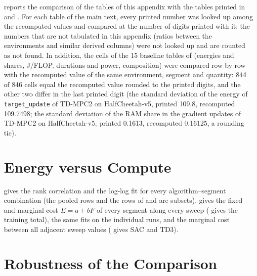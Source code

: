  reports the comparison of the tables of this appendix with the tables printed in  and .
For each table of the main text, every printed number was looked up among the recomputed values and compared at the number of digits printed with it; the numbers that are not tabulated in this appendix (ratios between the environments and similar derived columns) were not looked up and are counted as not found.
In addition, the cells of the \num{15} baseline tables of  (energies and shares, J/FLOP, durations and power, composition) were compared row by row with the recomputed value of the same environment, segment and quantity: \num{844} of \num{846} cells equal the recomputed value rounded to the printed digits, and the other two differ in the last printed digit (the standard deviation of the energy of \texttt{target\_update} of TD-MPC2 on HalfCheetah-v5, printed \num{109.8}, recomputed \num{109.7498}; the standard deviation of the RAM share in the gradient updates of TD-MPC2 on HalfCheetah-v5, printed \num{0.1613}, recomputed \num{0.16125}, a rounding tie).


\section{Energy versus Compute}\label{sec:app-full-ec}

 gives the rank correlation and the log-log fit for every algorithm--segment combination (the pooled rows and the rows of  and  are subsets).
 gives the fixed and marginal cost $E=a+bF$ of every segment along every sweep ( gives the training total),  the same fits on the individual runs, and  the marginal cost between all adjacent sweep values ( gives SAC and TD3).


\section{Robustness of the Comparison}\label{sec:app-full-rob}

